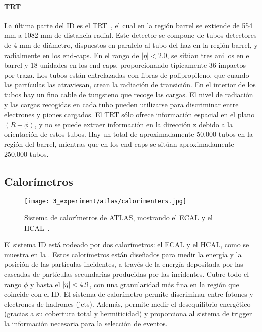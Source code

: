 \paragraph{\acf{TRT}}
La última parte del \ac{ID} es el \ac{TRT}~\cite{ATLAS-TRT-DesignPerformance}, el cual en la regi\'on barrel se extiende de 554 mm a 1082 mm de distancia radial. Este detector se compone de tubos detectores de 4 mm de diámetro, dispuestos en paralelo al tubo del haz en la regi\'on barrel, y radialmente en los end-caps. En el rango de $|\eta| < 2.0$, se sit\'uan tres anillos en el barrel y 18 unidades en los end-caps, proporcionando típicamente 36 impactos por traza. Los tubos están entrelazadas con fibras de polipropileno, que cuando las part\'iculas las atraviesan, crean la radiación de transición. En el interior de los tubos hay un fino cable de tungsteno que recoge las cargas. El nivel de radiación y las cargas recogidas en cada tubo pueden utilizarse para discriminar entre electrones y piones cargados. El \ac{TRT} sólo ofrece información espacial en el plano $(R-\phi)$, y no se puede extraer información en la dirección z debido a la orientación de estos tubos. Hay un total de aproximadamente 50,000 tubos en la región del barrel, mientras que en los end-caps se sit\'uan aproximadamente 250,000 tubos.








\subsection{Calor\'imetros}

\begin{figure}[ht!]
    \centering
    \texttt{[image: 3\_experiment/atlas/calorimenters.jpg]}
    \caption{Sistema de calor\'imetros de \ac{ATLAS}, mostrando el \acf{ECAL} y el \acf{HCAL}~\cite{ATLAS-Calorimeter-Diagram}.}
    \label{fig:atlas:atlas:atlas_calorimeters}
\end{figure}

El sistema \ac{ID} está rodeado por dos calorímetros: el \acf{ECAL} y el \acf{HCAL}, como se muestra en la \Fig{\ref{fig:atlas:atlas:atlas_calorimeters}}. Estos calorímetros están diseñados para medir la energía y la posición de las partículas incidentes, a través de la energía depositada por las cascadas de partículas secundarias producidas por las incidentes. Cubre todo el rango \(\phi\) y hasta el \(|\eta|<4.9\), con una granularidad más fina en la región que coincide con el \ac{ID}.
El sistema de calorímetro permite discriminar entre fotones y electrones de hadrones (jets). Además, permite medir el desequilibrio energético (gracias a su cobertura total y hermiticidad) y proporciona al sistema de trigger la información necesaria para la selección de eventos.

